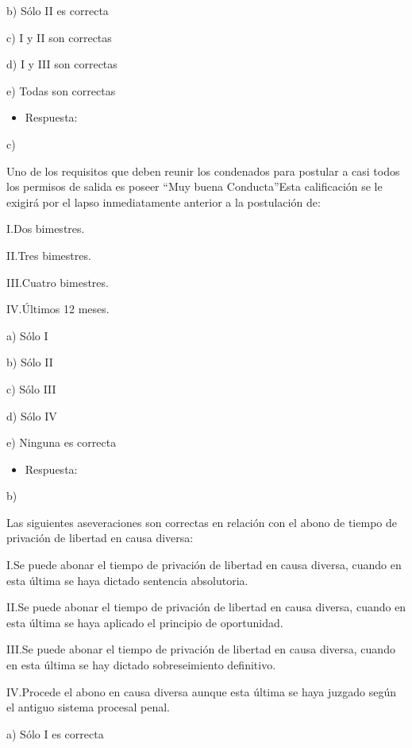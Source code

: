 \documentclass[letterpaper, 11pt]{article}
\begin{document}
b) Sólo II es correcta

c) I y II son correctas

d) I y III son correctas

e) Todas son correctas


\begin{itemize}
\item Respuesta:
\end{itemize}

c)


Uno de los requisitos que deben reunir los condenados para postular a
casi todos los permisos de salida es poseer “Muy buena Conducta”Esta
calificación se le exigirá por el lapso inmediatamente anterior a la
postulación de:


I.Dos bimestres.


II.Tres bimestres.


III.Cuatro bimestres.


IV.Últimos 12 meses.


a) Sólo I

b) Sólo II

c) Sólo III

d) Sólo IV

e) Ninguna es correcta


\begin{itemize}
\item Respuesta:
\end{itemize}

b)


Las siguientes aseveraciones son correctas en relación con el abono de
tiempo de privación de libertad en causa diversa:


I.Se puede abonar el tiempo de privación de libertad en causa diversa,
cuando en esta última se haya dictado sentencia absolutoria.



II.Se puede abonar el tiempo de privación de libertad en causa
diversa, cuando en esta última se haya aplicado el principio de
oportunidad.



III.Se puede abonar el tiempo de privación de libertad en causa
diversa, cuando en esta última se hay dictado sobreseimiento
definitivo.



IV.Procede el abono en causa diversa aunque esta última se haya
juzgado según el antiguo sistema procesal penal.



a) Sólo I es correcta
\end{document}
